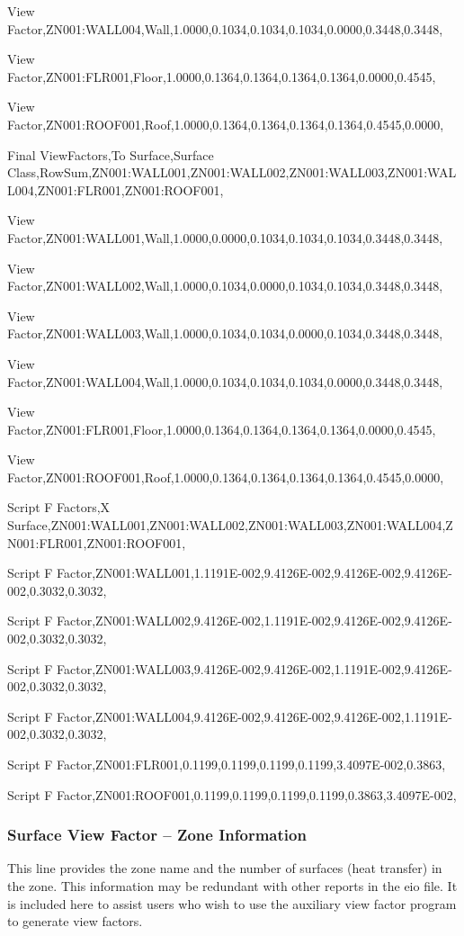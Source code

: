 View Factor,ZN001:WALL004,Wall,1.0000,0.1034,0.1034,0.1034,0.0000,0.3448,0.3448,

View Factor,ZN001:FLR001,Floor,1.0000,0.1364,0.1364,0.1364,0.1364,0.0000,0.4545,

View Factor,ZN001:ROOF001,Roof,1.0000,0.1364,0.1364,0.1364,0.1364,0.4545,0.0000,

Final ViewFactors,To Surface,Surface Class,RowSum,ZN001:WALL001,ZN001:WALL002,ZN001:WALL003,ZN001:WALL004,ZN001:FLR001,ZN001:ROOF001,

View Factor,ZN001:WALL001,Wall,1.0000,0.0000,0.1034,0.1034,0.1034,0.3448,0.3448,

View Factor,ZN001:WALL002,Wall,1.0000,0.1034,0.0000,0.1034,0.1034,0.3448,0.3448,

View Factor,ZN001:WALL003,Wall,1.0000,0.1034,0.1034,0.0000,0.1034,0.3448,0.3448,

View Factor,ZN001:WALL004,Wall,1.0000,0.1034,0.1034,0.1034,0.0000,0.3448,0.3448,

View Factor,ZN001:FLR001,Floor,1.0000,0.1364,0.1364,0.1364,0.1364,0.0000,0.4545,

View Factor,ZN001:ROOF001,Roof,1.0000,0.1364,0.1364,0.1364,0.1364,0.4545,0.0000,

Script F Factors,X Surface,ZN001:WALL001,ZN001:WALL002,ZN001:WALL003,ZN001:WALL004,ZN001:FLR001,ZN001:ROOF001,

Script F Factor,ZN001:WALL001,1.1191E-002,9.4126E-002,9.4126E-002,9.4126E-002,0.3032,0.3032,

Script F Factor,ZN001:WALL002,9.4126E-002,1.1191E-002,9.4126E-002,9.4126E-002,0.3032,0.3032,

Script F Factor,ZN001:WALL003,9.4126E-002,9.4126E-002,1.1191E-002,9.4126E-002,0.3032,0.3032,

Script F Factor,ZN001:WALL004,9.4126E-002,9.4126E-002,9.4126E-002,1.1191E-002,0.3032,0.3032,

Script F Factor,ZN001:FLR001,0.1199,0.1199,0.1199,0.1199,3.4097E-002,0.3863,

Script F Factor,ZN001:ROOF001,0.1199,0.1199,0.1199,0.1199,0.3863,3.4097E-002,

\subsubsection{Surface View Factor -- Zone Information}\label{surface-view-factor-zone-information}

This line provides the zone name and the number of surfaces (heat transfer) in the zone. This information may be redundant with other reports in the eio file. It is included here to assist users who wish to use the auxiliary view factor program to generate view factors.


